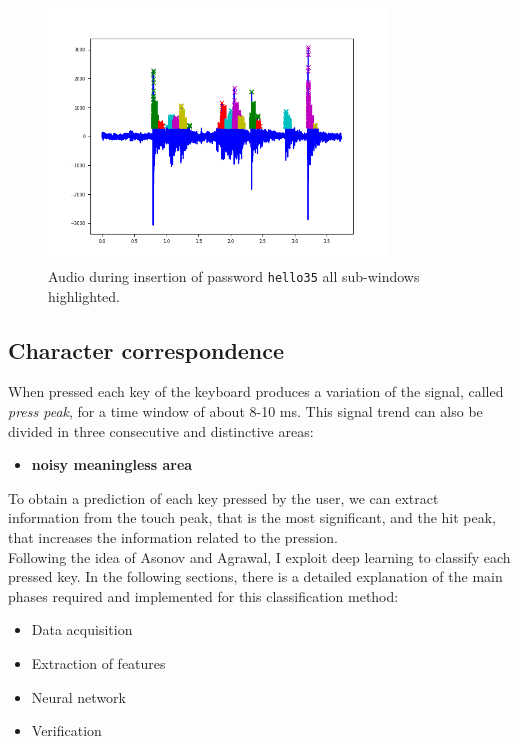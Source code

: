 \clearpage
\begin{figure}[h]
     \centering
	 \includegraphics[width=0.8\textwidth]{Images/AcCAPPCHA/hello35_time}
     \caption{\footnotesize{Audio during insertion of password \texttt{hello35} all sub-windows highlighted.}}\label{AcCAPPCHA:hello35_time}
\end{figure}
\subsection{Character correspondence}
When pressed each key of the keyboard produces a variation of the signal, called \textit{press peak}, for a time window of about 8-10 ms\cite{keyboard_acoustic}. This signal trend can also be divided in three consecutive and distinctive areas:
\begin{itemize}
\item{\textbf{noisy meaningless area}}
\end{itemize}
To obtain a prediction of each key pressed by the user, we can extract information from the touch peak, that is the most significant, and the hit peak, that increases the information related to the pression.\\
Following the idea of Asonov and Agrawal, I exploit deep learning to classify each pressed key. In the following sections, there is a detailed explanation of the main phases required and implemented for this classification method:
\begin{itemize}
\item{Data acquisition}
\item{Extraction of features}
\item{Neural network}
\item{Verification}
\end{itemize}

